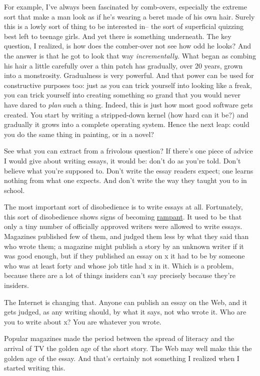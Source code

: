 \documentclass[12pt]{book}
\begin{document}
For example, I've always been fascinated by comb-overs, especially the
extreme sort that make a man look as if he's wearing a beret made of his
own hair. Surely this is a lowly sort of thing to be interested in-- the
sort of superficial quizzing best left to teenage girls. And yet there
is something underneath. The key question, I realized, is how does the
comber-over not see how odd he looks? And the answer is that he got to
look that way \emph{incrementally.} What began as combing his hair a
little carefully over a thin patch has gradually, over 20 years, grown
into a monstrosity. Gradualness is very powerful. And that power can be
used for constructive purposes too: just as you can trick yourself into
looking like a freak, you can trick yourself into creating something so
grand that you would never have dared to \emph{plan} such a thing.
Indeed, this is just how most good software gets created. You start by
writing a stripped-down kernel (how hard can it be?) and gradually it
grows into a complete operating system. Hence the next leap: could you
do the same thing in painting, or in a novel?

See what you can extract from a frivolous question? If there's one piece
of advice I would give about writing essays, it would be: don't do as
you're told. Don't believe what you're supposed to. Don't write the
essay readers expect; one learns nothing from what one expects. And
don't write the way they taught you to in school.

The most important sort of disobedience is to write essays at all.
Fortunately, this sort of disobedience shows signs of becoming
\href{http://www.ojr.org/ojr/glaser/1056050270.php}{rampant}. It used to
be that only a tiny number of officially approved writers were allowed
to write essays. Magazines published few of them, and judged them less
by what they said than who wrote them; a magazine might publish a story
by an unknown writer if it was good enough, but if they published an
essay on x it had to be by someone who was at least forty and whose job
title had x in it. Which is a problem, because there are a lot of things
insiders can't say precisely because they're insiders.

The Internet is changing that. Anyone can publish an essay on the Web,
and it gets judged, as any writing should, by what it says, not who
wrote it. Who are you to write about x? You are whatever you wrote.

Popular magazines made the period between the spread of literacy and the
arrival of TV the golden age of the short story. The Web may well make
this the golden age of the essay. And that's certainly not something I
realized when I started writing this.
\end{document}
